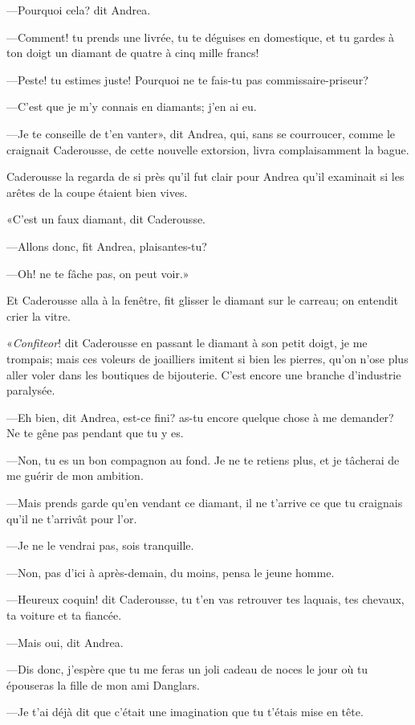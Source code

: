 —Pourquoi cela? dit Andrea. 

—Comment! tu prends une livrée, tu te déguises en domestique, et tu gardes à ton doigt un diamant de quatre à cinq mille francs! 

—Peste! tu estimes juste! Pourquoi ne te fais-tu pas commissaire-priseur? 

—C'est que je m'y connais en diamants; j'en ai eu. 

—Je te conseille de t'en vanter», dit Andrea, qui, sans se courroucer, comme le craignait Caderousse, de cette nouvelle extorsion, livra complaisamment la bague. 

Caderousse la regarda de si près qu'il fut clair pour Andrea qu'il examinait si les arêtes de la coupe étaient bien vives. 

«C'est un faux diamant, dit Caderousse. 

—Allons donc, fit Andrea, plaisantes-tu? 

—Oh! ne te fâche pas, on peut voir.» 

Et Caderousse alla à la fenêtre, fit glisser le diamant sur le carreau; on entendit crier la vitre. 

«\textit{Confiteor}! dit Caderousse en passant le diamant à son petit doigt, je me trompais; mais ces voleurs de joailliers imitent si bien les pierres, qu'on n'ose plus aller voler dans les boutiques de bijouterie. C'est encore une branche d'industrie paralysée. 

—Eh bien, dit Andrea, est-ce fini? as-tu encore quelque chose à me demander? Ne te gêne pas pendant que tu y es. 

—Non, tu es un bon compagnon au fond. Je ne te retiens plus, et je tâcherai de me guérir de mon ambition. 

—Mais prends garde qu'en vendant ce diamant, il ne t'arrive ce que tu craignais qu'il ne t'arrivât pour l'or. 

—Je ne le vendrai pas, sois tranquille. 

—Non, pas d'ici à après-demain, du moins, pensa le jeune homme. 

—Heureux coquin! dit Caderousse, tu t'en vas retrouver tes laquais, tes chevaux, ta voiture et ta fiancée. 

—Mais oui, dit Andrea. 

—Dis donc, j'espère que tu me feras un joli cadeau de noces le jour où tu épouseras la fille de mon ami Danglars. 

—Je t'ai déjà dit que c'était une imagination que tu t'étais mise en tête.  

